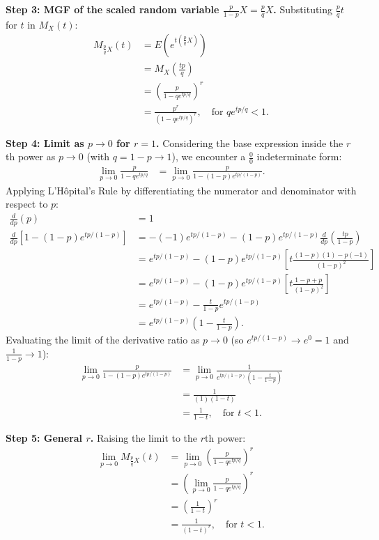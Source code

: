 \documentclass[11pt,a4paper]{article}
\begin{document}
\noindent \textbf{Step 3: MGF of the scaled random variable $\frac{p}{1-p}X = \frac{p}{q}X$.} Substituting $\frac{p}{q}t$ for $t$ in $M_X(t)$:
\begin{align*}
M_{\frac{p}{q}X}(t) &= E\left( e^{t \left(\frac{p}{q}X\right)} \right) \\
&= M_X\left( \frac{tp}{q} \right) \\
&= \left( \frac{p}{1 - q e^{tp/q}} \right)^r \\
&= \frac{p^r}{\left( 1 - q e^{tp/q} \right)^r}, \quad \text{for } q e^{tp/q} < 1.
\end{align*}

\noindent \textbf{Step 4: Limit as $p \to 0$ for $r = 1$.} Considering the base expression inside the $r$th power as $p \to 0$ (with $q = 1-p \to 1$), we encounter a $\frac{0}{0}$ indeterminate form:
\begin{align*}
\lim_{p \to 0} \frac{p}{1 - q e^{tp/q}} &= \lim_{p \to 0} \frac{p}{1 - (1-p) e^{tp/(1-p)}}.
\end{align*}
Applying L'H\^opital's Rule by differentiating the numerator and denominator with respect to $p$:
\begin{align*}
\frac{d}{dp}(p) &= 1 \\
\frac{d}{dp}\left[ 1 - (1-p) e^{tp/(1-p)} \right] &= -(-1)e^{tp/(1-p)} - (1-p) e^{tp/(1-p)} \frac{d}{dp}\left( \frac{tp}{1-p} \right) \\
&= e^{tp/(1-p)} - (1-p) e^{tp/(1-p)} \left[ t \frac{(1-p)(1) - p(-1)}{(1-p)^2} \right] \\
&= e^{tp/(1-p)} - (1-p) e^{tp/(1-p)} \left[ t \frac{1 - p + p}{(1-p)^2} \right] \\
&= e^{tp/(1-p)} - \frac{t}{1-p} e^{tp/(1-p)} \\
&= e^{tp/(1-p)} \left( 1 - \frac{t}{1-p} \right).
\end{align*}
Evaluating the limit of the derivative ratio as $p \to 0$ (so $e^{tp/(1-p)} \to e^0 = 1$ and $\frac{1}{1-p} \to 1$):
\begin{align*}
\lim_{p \to 0} \frac{p}{1 - (1-p) e^{tp/(1-p)}} &= \lim_{p \to 0} \frac{1}{e^{tp/(1-p)} \left( 1 - \frac{t}{1-p} \right)} \\
&= \frac{1}{(1)(1 - t)} \\
&= \frac{1}{1 - t}, \quad \text{for } t < 1.
\end{align*}

\noindent \textbf{Step 5: General $r$.} Raising the limit to the $r$th power:
\begin{align*}
\lim_{p \to 0} M_{\frac{p}{q}X}(t) &= \lim_{p \to 0} \left( \frac{p}{1 - q e^{tp/q}} \right)^r \\
&= \left( \lim_{p \to 0} \frac{p}{1 - q e^{tp/q}} \right)^r \\
&= \left( \frac{1}{1 - t} \right)^r \\
&= \frac{1}{(1 - t)^r}, \quad \text{for } t < 1.
\end{align*}
\end{document}

